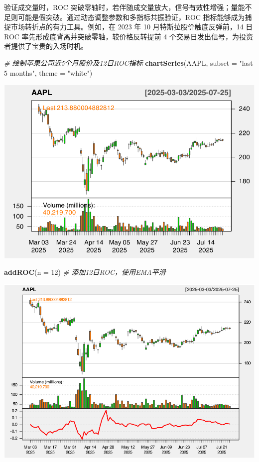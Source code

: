 \documentclass[]{ctexbook}
\newenvironment{Shaded}{\begin{snugshade}}{\end{snugshade}}
\newcommand{\AttributeTok}[1]{\textcolor[rgb]{0.13,0.29,0.53}{#1}}
\newcommand{\CommentTok}[1]{\textcolor[rgb]{0.56,0.35,0.01}{\textit{#1}}}
\newcommand{\DecValTok}[1]{\textcolor[rgb]{0.00,0.00,0.81}{#1}}
\newcommand{\FunctionTok}[1]{\textcolor[rgb]{0.13,0.29,0.53}{\textbf{#1}}}
\newcommand{\NormalTok}[1]{#1}
\newcommand{\StringTok}[1]{\textcolor[rgb]{0.31,0.60,0.02}{#1}}
\begin{document}
验证成交量时，ROC 突破零轴时，若伴随成交量放大，信号有效性增强；量能不足则可能是假突破。通过动态调整参数和多指标共振验证，ROC 指标能够成为捕捉市场转折点的有力工具。例如，在 2023 年 10 月特斯拉股价触底反弹前，14 日 ROC 率先形成底背离并突破零轴，较价格反转提前 4 个交易日发出信号，为投资者提供了宝贵的入场时机。

\begin{Shaded}
\begin{Highlighting}[]
\CommentTok{\# 绘制苹果公司近5个月股价及12日ROC指标  }
\FunctionTok{chartSeries}\NormalTok{(AAPL, }\AttributeTok{subset =} \StringTok{"last 5 months"}\NormalTok{, }\AttributeTok{theme =} \StringTok{"white"}\NormalTok{)  }
\end{Highlighting}
\end{Shaded}

\includegraphics[width=0.9\linewidth]{QuantmodHandbook_files/figure-latex/roc_2-1}

\begin{Shaded}
\begin{Highlighting}[]
\FunctionTok{addROC}\NormalTok{(}\AttributeTok{n =} \DecValTok{12}\NormalTok{)  }\CommentTok{\# 添加12日ROC，使用EMA平滑  }
\end{Highlighting}
\end{Shaded}

\includegraphics[width=0.9\linewidth]{QuantmodHandbook_files/figure-latex/roc_2-2}
\end{document}
